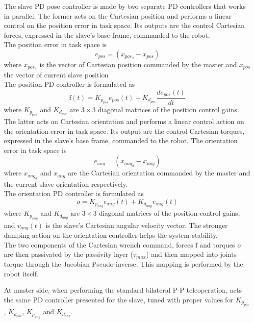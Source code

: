 The slave PD pose controller is made by two separate PD controllers that works in parallel.
The former acts on the Cartesian position and performs a linear control on the position error in task space. Its outputs are the control Cartesian forces, expressed in the slave's base frame, commanded to the robot.\\
The position error in task space is
\begin{equation}
e_{pos} = \left( x_{pos_{d}}-  x_{pos}\right) 
\end{equation}
where $x_{pos_{d}}$ is the vector of Cartesian position commanded by the master and  $x_{pos}$ the vector of current slave position\\
The position PD controller is formulated as
\begin{equation}
	\mathrm{f}(t)= K_{p_{pos}}e_{pos}(t) + K_{d_{pos}}\dfrac{de_{pos}(t)}{dt}
\end{equation}
where $K_{p_{pos}}$ and $K_{d_{pos}}$ are $3\times3$ diagonal matrices of the position control gains.
The latter acts on Cartesian orientation and performs a linear control action on the orientation error in task space. Its output are the control Cartesian torques, expressed in the slave's base frame, commanded to the robot.
The orientation error in task space is
\begin{equation}
e_{ang} = \left( x_{ang_{d}} -  x_{ang}\right) 
\end{equation}
where $x_{ang_{d}}$ and  $x_{ang}$ are the Cartesian orientation commanded by the master and the current slave orientation respectively.\\
The orientation PD controller is formulated as
\begin{equation}
o = K_{p_{ang}}e_{ang}(t) + K_{d_{ang}}v_{ang}(t)
\end{equation}
where $K_{p_{ang}}$ and $K_{d_{ang}}$ are $3\times3$ diagonal matrices of the position control gains, and $v_{ang}(t)$ is the slave's Cartesian angular velocity vector.
The stronger damping action on the orientation controller helps the system stability.\\
The two components of the Cartesian wrench command, forces $\mathrm{f}$ and torques $o$ are then passivated by the passivity layer ($\tau_{max}$) and then mapped into joints torque through the Jacobian Pseudo-inverse.
This mapping is performed by the robot itself.

At master side, when performing the standard bilateral P-P teleoperation, acts the same PD controller presented for the slave, tuned with proper values for $K_{p_{pos}}$, $K_{d_{pos}}$, $K_{p_{ang}}$ and $K_{d_{ang}}$.

